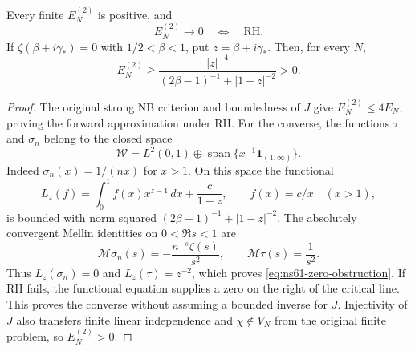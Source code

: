 \begin{proposition}
\label{prop:ns61-rh-equivalence}
Every finite $E_N^{(2)}$ is positive, and
\[
 E_N^{(2)}\longrightarrow0\quad\Longleftrightarrow\quad\mathrm{RH}.
\]
If $\zeta(\beta+i\gamma_*)=0$ with $1/2<\beta<1$, put
$z=\beta+i\gamma_*$. Then, for every $N$,
\begin{equation}
 E_N^{(2)}\geq
 \frac{|z|^{-4}}{(2\beta-1)^{-1}+|1-z|^{-2}}>0.
 \label{eq:ns61-zero-obstruction}
\end{equation}
\end{proposition}
\begin{proof}
The original strong NB criterion and boundedness of $J$ give
$E_N^{(2)}\leq4E_N$, proving the forward approximation under RH.
For the converse, the functions $\tau$ and $\sigma_n$ belong to the
closed space
\[
 \mathcal W=L^2(0,1)\oplus
       \operatorname{span}\{x^{-1}\mathbf1_{(1,\infty)}\}.
\]
Indeed $\sigma_n(x)=1/(nx)$ for $x>1$. On this space the functional
\[
 L_z(f)=\int_0^1 f(x)x^{z-1}\,dx+\frac{c}{1-z},
 \qquad f(x)=c/x\quad(x>1),
\]
is bounded with norm squared $(2\beta-1)^{-1}+|1-z|^{-2}$.
The absolutely convergent Mellin identities on $0<\Re s<1$ are
\[
 \mathcal M\sigma_n(s)=-\frac{n^{-s}\zeta(s)}{s^2},
 \qquad \mathcal M\tau(s)=\frac1{s^2}.
\]
Thus $L_z(\sigma_n)=0$ and $L_z(\tau)=z^{-2}$, which proves
\eqref{eq:ns61-zero-obstruction}. If RH fails, the functional equation
supplies a zero on the right of the critical line. This proves the
converse without assuming a bounded inverse for $J$.
Injectivity of $J$ also transfers finite linear independence and
$\chi\notin V_N$ from the original finite problem, so $E_N^{(2)}>0$.
\end{proof}

